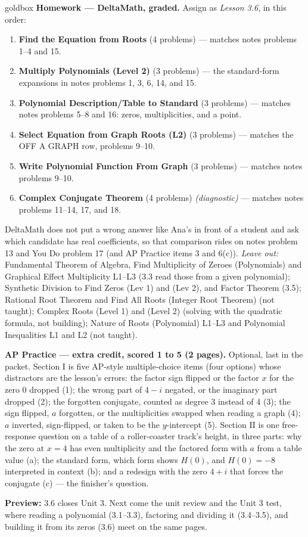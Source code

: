 \documentclass[10pt]{article}
\begin{document}
\begin{skillbox}{goldbox}
\textbf{Homework --- DeltaMath, graded.} Assign as \textit{Lesson 3.6}, in this order:
\begin{enumerate}[itemsep=1pt,topsep=2pt]
  \item \textbf{Find the Equation from Roots} (4 problems) --- matches notes problems 1--4 and 15.
  \item \textbf{Multiply Polynomials (Level 2)} (3 problems) --- the standard-form expansions in
        notes problems 1, 3, 6, 14, and 15.
  \item \textbf{Polynomial Description/Table to Standard} (3 problems) --- matches notes problems
        5--8 and 16: zeros, multiplicities, and a point.
  \item \textbf{Select Equation from Graph Roots (L2)} (3 problems) --- matches the OFF A GRAPH
        row, problems 9--10.
  \item \textbf{Write Polynomial Function From Graph} (3 problems) --- matches notes problems 9--10.
  \item \textbf{Complex Conjugate Theorem} (4 problems) \textit{(diagnostic)} --- matches notes
        problems 11--14, 17, and 18.
\end{enumerate}
DeltaMath does not put a wrong answer like Ana's in front of a student and ask which candidate
has real coefficients, so that comparison rides on notes problem 13 and You Do problem 17 (and
AP Practice items 3 and 6(c)).
\textit{Leave out:} Fundamental Theorem of Algebra, Find Multiplicity of Zeroes (Polynomials)
and Graphical Effect Multiplicity L1--L3 (3.3 read those from a given polynomial); Synthetic
Division to Find Zeros (Lev 1) and (Lev 2), and Factor Theorem (3.5); Rational Root Theorem and
Find All Roots (Integer Root Theorem) (not taught); Complex Roots (Level 1) and (Level 2)
(solving with the quadratic formula, not building); Nature of Roots (Polynomial) L1--L3 and
Polynomial Inequalities L1 and L2 (not taught).

\textbf{AP Practice --- extra credit, scored 1 to 5 (2 pages).} Optional, last in the packet.
Section I is five AP-style multiple-choice items (four options) whose distractors are the
lesson's errors: the factor sign flipped or the factor $x$ for the zero 0 dropped (1); the
wrong part of $4 - i$ negated, or the imaginary part dropped (2); the forgotten conjugate,
counted as degree 3 instead of 4 (3); the sign flipped, $a$ forgotten, or the multiplicities
swapped when reading a graph (4); $a$ inverted, sign-flipped, or taken to be the
$y$-intercept (5). Section II is one free-response question on a table of a roller-coaster
track's height, in three parts: why the zero at $x = 4$ has even multiplicity and the factored
form with $a$ from a table value (a); the standard form, which form shows $H(0)$, and $H(0) = -8$
interpreted in context (b); and a redesign with the zero $4 + i$ that forces the conjugate (c) ---
the finisher's question.

\textbf{Preview:} 3.6 closes Unit 3. Next come the unit review and the Unit 3 test, where
reading a polynomial (3.1--3.3), factoring and dividing it (3.4--3.5), and building it from its
zeros (3.6) meet on the same pages.
\end{skillbox}
\end{document}
